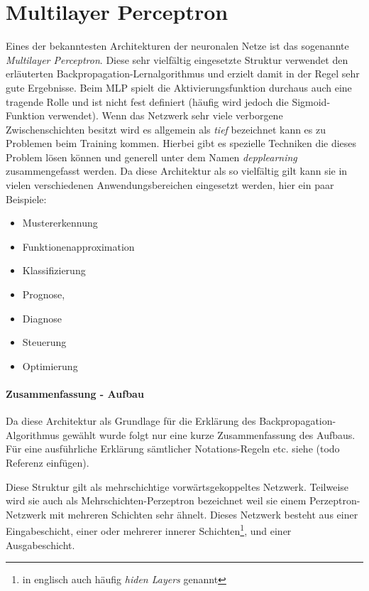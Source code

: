 \section{Multilayer Perceptron}

Eines der bekanntesten Architekturen der neuronalen Netze ist das sogenannte \emph{Multilayer Perceptron}. Diese sehr vielfältig eingesetzte Struktur verwendet den erläuterten Backpropagation-Lernalgorithmus und erzielt damit in der Regel sehr gute Ergebnisse. Beim MLP spielt die Aktivierungsfunktion durchaus auch eine tragende Rolle und ist nicht fest definiert (häufig wird jedoch die Sigmoid-Funktion verwendet). Wenn das Netzwerk sehr viele verborgene Zwischenschichten besitzt wird es allgemein als \emph{tief} bezeichnet kann es zu Problemen beim Training kommen. Hierbei gibt es spezielle Techniken die dieses Problem lösen können und generell unter dem Namen \emph{depplearning} zusammengefasst werden. Da diese Architektur als so vielfältig gilt kann sie in vielen verschiedenen Anwendungsbereichen eingesetzt werden, hier ein paar Beispiele: 

\begin{multicols}{2}
\begin{itemize}
\item Mustererkennung 
\item Funktionenapproximation
\item Klassifizierung
\item Prognose,
\item Diagnose
\item Steuerung 
\item Optimierung
\end{itemize}
\end{multicols}

\paragraph{Zusammenfassung - Aufbau}

Da diese Architektur als Grundlage für die Erklärung des Backpropagation-Algorithmus gewählt wurde folgt nur eine kurze Zusammenfassung des Aufbaus. Für eine ausführliche Erklärung sämtlicher Notations-Regeln etc. siehe (todo Referenz einfügen). 

Diese Struktur gilt als mehrschichtige vorwärtsgekoppeltes Netzwerk. Teilweise wird sie auch als Mehrschichten-Perzeptron bezeichnet weil sie einem Perzeptron-Netzwerk mit mehreren Schichten sehr ähnelt. Dieses Netzwerk besteht aus einer Eingabeschicht, einer oder mehrerer innerer Schichten\footnote{in englisch auch häufig \emph{hiden Layers} genannt}, und einer Ausgabeschicht. 

